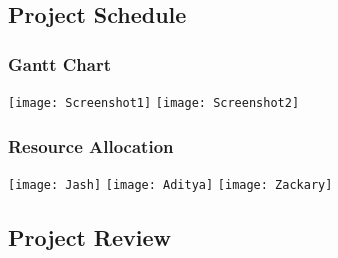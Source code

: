 \documentclass[11pt, oneside]{article}   	%
\begin{document}
\newpage
\subsection*{Project Schedule}
\subsubsection*{Gantt Chart}
\texttt{[image: Screenshot1]}
\texttt{[image: Screenshot2]}\\

\pagebreak
\noindent
\subsubsection*{Resource Allocation}
\texttt{[image: Jash]}
\texttt{[image: Aditya]}
\texttt{[image: Zackary]}
\newpage
\subsection*{Project Review}
\end{document}
